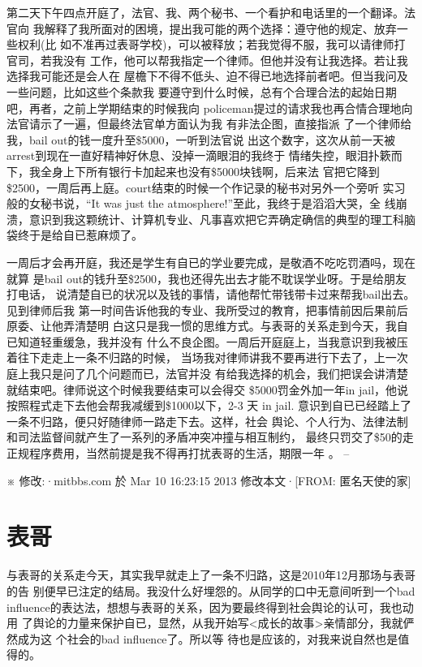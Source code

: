 \documentclass[12pt]{book}
\begin{document}
第二天下午四点开庭了，法官、我、两个秘书、一个看护和电话里的一个翻译。法官向
我解释了我所面对的困境，提出我可能的两个选择：遵守他的规定、放弃一些权利(比
如不准再过表哥学校)，可以被释放；若我觉得不服，我可以请律师打官司，若我没有
工作，他可以帮我指定一个律师。但他并没有让我选择。若让我选择我可能还是会人在
屋檐下不得不低头、迫不得已地选择前者吧。但当我问及一些问题，比如这些个条款我
要遵守到什么时候，总有个合理合法的起始日期吧，再者，之前上学期结束的时候我向
policeman提过的请求我也再合情合理地向法官请示了一遍，但最终法官单方面认为我
有非法企图，直接指派 了一个律师给我，bail out的钱一度升至\$5000，一听到法官说
出这个数字，这次从前一天被arrest到现在一直好精神好休息、没掉一滴眼泪的我终于
情绪失控，眼泪扑簌而下，我全身上下所有银行卡加起来也没有\$5000块钱啊，后来法
官把它降到\$2500，一周后再上庭。court结束的时候一个作记录的秘书对另外一个旁听
实习般的女秘书说，“It was just the atmosphere!”至此，我终于是滔滔大哭，全
线崩溃，意识到我这颗统计、计算机专业、凡事喜欢把它弄确定确信的典型的理工科脑
袋终于是给自已惹麻烦了。

一周后才会再开庭，我还是学生有自已的学业要完成，是敬酒不吃吃罚酒吗，现在就算
是bail out的钱升至\$2500，我也还得先出去才能不耽误学业呀。于是给朋友打电话，
说清楚自已的状况以及钱的事情，请他帮忙带钱带卡过来帮我bail出去。见到律师后我
第一时间告诉他我的专业、我所受过的教育，把事情前因后果前后原委、让他弄清楚明
白这只是我一惯的思维方式。与表哥的关系走到今天，我自已知道轻重缓急，我并没有
什么不良企图。一周后开庭庭上，当我意识到我被压着往下走走上一条不归路的时候，
当场我对律师讲我不要再进行下去了，上一次庭上我只是问了几个问题而已，法官并没
有给我选择的机会，我们把误会讲清楚就结束吧。律师说这个时候我要结束可以会得交
\$5000罚金外加一年in jail，他说按照程式走下去他会帮我减缓到\$1000以下，2-3 天
in jail. 意识到自已已经踏上了一条不归路，便只好随律师一路走下去。这样，社会
舆论、个人行为、法律法制和司法监督间就产生了一系列的矛盾冲突冲撞与相互制约，
最终只罚交了\$50的走正规程序费用，当然前提是我不得再打扰表哥的生活，期限一年
。
--

※ 修改:·mitbbs.com 於 Mar 10 16:23:15 2013 修改本文·[FROM: 匿名天使的家]
\section{表哥}
\label{sec-12-7}

与表哥的关系走今天，其实我早就走上了一条不归路，这是2010年12月那场与表哥的告
别便早已注定的结局。我没什么好埋怨的。从同学的口中无意间听到一个bad 
influence的表达法，想想与表哥的关系，因为要最终得到社会舆论的认可，我也动用
了舆论的力量来保护自已，显然，从我开始写<成长的故事>亲情部分，我就俨然成为这
个社会的bad influence了。所以等 待也是应该的，对我来说自然也是值得的。
\end{document}
